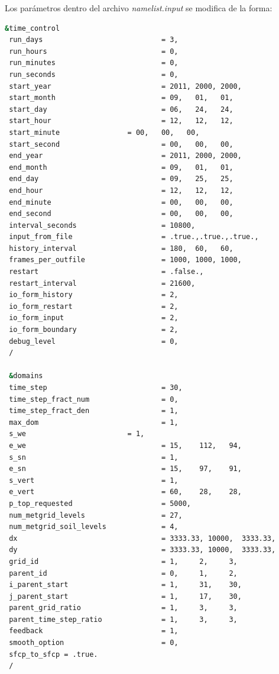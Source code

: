 \documentclass[12pt,letter]{article}
\begin{document}
\noindent Los par\'ametros dentro del archivo \textit{namelist.input} se modifica de la forma:
\begin{lstlisting}[language=bash]
 &time_control
 run_days                            = 3,
 run_hours                           = 0,
 run_minutes                         = 0,
 run_seconds                         = 0,
 start_year                          = 2011, 2000, 2000,
 start_month                         = 09,   01,   01,
 start_day                           = 06,   24,   24,
 start_hour                          = 12,   12,   12,
 start_minute			     = 00,   00,   00,
 start_second                        = 00,   00,   00,
 end_year                            = 2011, 2000, 2000,
 end_month                           = 09,   01,   01,
 end_day                             = 09,   25,   25,
 end_hour                            = 12,   12,   12,
 end_minute                          = 00,   00,   00,
 end_second                          = 00,   00,   00,
 interval_seconds                    = 10800,
 input_from_file                     = .true.,.true.,.true.,
 history_interval                    = 180,  60,   60,
 frames_per_outfile                  = 1000, 1000, 1000,
 restart                             = .false.,
 restart_interval                    = 21600,
 io_form_history                     = 2,
 io_form_restart                     = 2,
 io_form_input                       = 2,
 io_form_boundary                    = 2,
 debug_level                         = 0,
 /

 &domains
 time_step                           = 30,
 time_step_fract_num                 = 0,
 time_step_fract_den                 = 1,
 max_dom                             = 1,
 s_we			             = 1,
 e_we                                = 15,    112,   94,
 s_sn                                = 1,
 e_sn                                = 15,    97,    91,
 s_vert                              = 1,
 e_vert                              = 60,    28,    28,
 p_top_requested                     = 5000,
 num_metgrid_levels                  = 27,
 num_metgrid_soil_levels             = 4,
 dx                                  = 3333.33, 10000,  3333.33,
 dy                                  = 3333.33, 10000,  3333.33,
 grid_id                             = 1,     2,     3,
 parent_id                           = 0,     1,     2,
 i_parent_start                      = 1,     31,    30,
 j_parent_start                      = 1,     17,    30,
 parent_grid_ratio                   = 1,     3,     3,
 parent_time_step_ratio              = 1,     3,     3,
 feedback                            = 1,
 smooth_option                       = 0,
 sfcp_to_sfcp = .true.
 /


\end{lstlisting}
\end{document}
